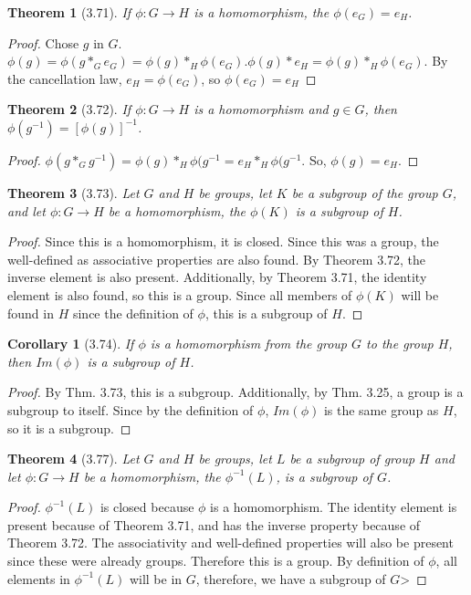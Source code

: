 \documentclass{article}
\newtheorem*{thm}{Theorem}
\newtheorem*{cor}{Corollary}
\begin{document}
\begin{thm}[3.71]
	If $\phi : G \rightarrow H$ is a homomorphism, the $\phi(e_G) = e_H$. 
\end{thm}
\begin{proof}
	Chose $g$ in $G$.  $\phi(g) = \phi(g *_G e_G) = \phi(g) *_H \phi(e_G). 
	\phi(g) * e_H = \phi(g) *_H \phi(e_G)$. By the cancellation law, $e_H = \phi(e_G)$, so $\phi(e_G) = e_H$
\end{proof}

\begin{thm}[3.72]
	If $\phi: G \rightarrow H$ is a homomorphism and $g \in G$, then $\phi(g^{-1}) = [\phi(g)]^{-1}$.
\end{thm}
\begin{proof}
	$\phi(g *_G g^{-1}) = \phi(g) *_H \phi(g^{-1} = e_H *_H \phi(g^{-1}$. So, $\phi(g) = e_H$. 
\end{proof}

\begin{thm}[3.73]
	Let $G$ and $H$ be groups, let $K$ be a subgroup of the group $G$, and let $\phi : G \rightarrow H$ be a homomorphism, the
	$\phi(K)$ is a subgroup of $H$. 
\end{thm}
\begin{proof}
	Since this is a homomorphism, it is closed. Since this was a group, the well-defined as associative properties are also found. By
	Theorem 3.72, the inverse element is also present. Additionally, by Theorem 3.71, the identity element is also found, so this is a group.
	Since all members of $\phi(K)$ will be found in $H$ since the definition of $\phi$, this is a subgroup of $H$.
\end{proof}

\begin{cor}[3.74]
	If $\phi$ is a homomorphism from the group $G$ to the group $H$, then $Im(\phi)$ is a subgroup of $H$. 
\end{cor}
\begin{proof}
	By Thm. 3.73, this is a subgroup. Additionally, by Thm. 3.25, a group is a subgroup to itself. Since by the definition of $\phi$, $Im(\phi)$ is 
	the same group as $H$, so it is a subgroup.
\end{proof}

\begin{thm}[3.77]
	Let $G$ and $H$ be groups, let $L$ be a subgroup of group $H$ and let $\phi: G \rightarrow H$ be a homomorphism, the $\phi^{-1}(L)$, is
	a subgroup of $G$.
\end{thm}
\begin{proof}
	$\phi^{-1}(L)$ is closed because $\phi$ is a homomorphism. The identity element is present because of Theorem 3.71, and has the inverse
	property because of Theorem 3.72. The associativity and well-defined properties will also be present since these were already groups. Therefore
	this is a group.  By 
	definition of $\phi$, all elements in $\phi^{-1}(L)$ will be in $G$, therefore, we have a subgroup of $G$>
\end{proof}
\end{document}
